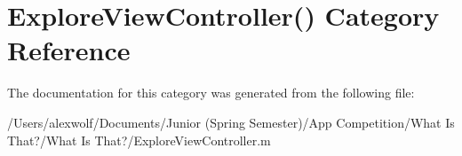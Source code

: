 \hypertarget{category_explore_view_controller_07_08}{\section{Explore\-View\-Controller() Category Reference}
\label{category_explore_view_controller_07_08}
}


The documentation for this category was generated from the following file\-:\begin{DoxyCompactItemize}
\item 
/\-Users/alexwolf/\-Documents/\-Junior (\-Spring Semester)/\-App Competition/\-What Is That?/\-What Is That?/Explore\-View\-Controller.\-m\end{DoxyCompactItemize}
